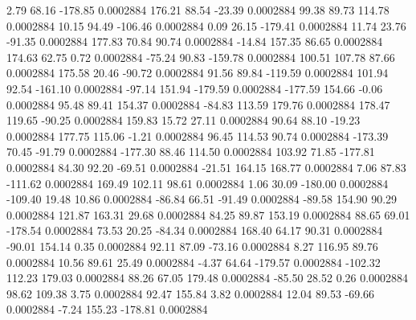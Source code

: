         2.79       68.16     -178.85     0.0002884
      176.21       88.54      -23.39     0.0002884
       99.38       89.73      114.78     0.0002884
       10.15       94.49     -106.46     0.0002884
        0.09       26.15     -179.41     0.0002884
       11.74       23.76      -91.35     0.0002884
      177.83       70.84       90.74     0.0002884
      -14.84      157.35       86.65     0.0002884
      174.63       62.75        0.72     0.0002884
      -75.24       90.83     -159.78     0.0002884
      100.51      107.78       87.66     0.0002884
      175.58       20.46      -90.72     0.0002884
       91.56       89.84     -119.59     0.0002884
      101.94       92.54     -161.10     0.0002884
      -97.14      151.94     -179.59     0.0002884
     -177.59      154.66       -0.06     0.0002884
       95.48       89.41      154.37     0.0002884
      -84.83      113.59      179.76     0.0002884
      178.47      119.65      -90.25     0.0002884
      159.83       15.72       27.11     0.0002884
       90.64       88.10      -19.23     0.0002884
      177.75      115.06       -1.21     0.0002884
       96.45      114.53       90.74     0.0002884
     -173.39       70.45      -91.79     0.0002884
     -177.30       88.46      114.50     0.0002884
      103.92       71.85     -177.81     0.0002884
       84.30       92.20      -69.51     0.0002884
      -21.51      164.15      168.77     0.0002884
        7.06       87.83     -111.62     0.0002884
      169.49      102.11       98.61     0.0002884
        1.06       30.09     -180.00     0.0002884
     -109.40       19.48       10.86     0.0002884
      -86.84       66.51      -91.49     0.0002884
      -89.58      154.90       90.29     0.0002884
      121.87      163.31       29.68     0.0002884
       84.25       89.87      153.19     0.0002884
       88.65       69.01     -178.54     0.0002884
       73.53       20.25      -84.34     0.0002884
      168.40       64.17       90.31     0.0002884
      -90.01      154.14        0.35     0.0002884
       92.11       87.09      -73.16     0.0002884
        8.27      116.95       89.76     0.0002884
       10.56       89.61       25.49     0.0002884
       -4.37       64.64     -179.57     0.0002884
     -102.32      112.23      179.03     0.0002884
       88.26       67.05      179.48     0.0002884
      -85.50       28.52        0.26     0.0002884
       98.62      109.38        3.75     0.0002884
       92.47      155.84        3.82     0.0002884
       12.04       89.53      -69.66     0.0002884
       -7.24      155.23     -178.81     0.0002884
